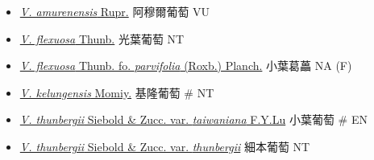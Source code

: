 \begin{itemize}
  \begin{itemize}
        \item[] \href{http://www.theplantlist.org/tpl1.1/search?q=Vitis+amurenensis}{\textit{V. amurenensis} Rupr.}   阿穆爾葡萄   VU
        \item[] \href{http://www.theplantlist.org/tpl1.1/search?q=Vitis+flexuosa}{\textit{V. flexuosa} Thunb.}   光葉葡萄   NT
        \item[] \href{http://www.theplantlist.org/tpl1.1/search?q=Vitis+flexuosa+fo.+parvifolia}{\textit{V. flexuosa} Thunb. fo. \textit{parvifolia} (Roxb.) Planch.}   小葉葛藟   NA (F)
        \item[] \href{http://www.theplantlist.org/tpl1.1/search?q=Vitis+kelungensis}{\textit{V. kelungensis} Momiy.}   基隆葡萄  \# NT
        \item[] \href{http://www.theplantlist.org/tpl1.1/search?q=Vitis+thunbergii+var.+taiwaniana}{\textit{V. thunbergii} Siebold \& Zucc. var. \textit{taiwaniana} F.Y.Lu}   小葉葡萄  \# EN
        \item[] \href{http://www.theplantlist.org/tpl1.1/search?q=Vitis+thunbergii+var.+thunbergii}{\textit{V. thunbergii} Siebold \& Zucc. var. \textit{thunbergii}}   細本葡萄   NT
  \end{itemize}
  \end{itemize}
